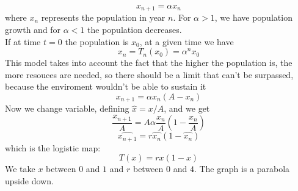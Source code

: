 $$
	x_{n+1} = \alpha x_n
$$
where $x_n$ represents the population in year $n$. For $\alpha > 1$, we have population growth and for $\alpha < 1$ the population decreases. \\
If at time $t=0$ the population is $x_0$, at a given time we have
$$
	x_n = T_n(x_0) = \alpha^n x_0
$$
This model takes into account the fact that the higher the population is, the more resouces are needed, so there should be a limit that can't be surpassed, because the enviroment wouldn't be able to sustain it
$$
	x_{n+1} = \alpha x_n(A-x_n)
$$
Now we change variable, defining $\hat{x} = x/A$, and we get
$$
	\frac{x_{n+1}}{A} = A\alpha \frac{x_n}{A}\left(1 - \frac{x_n}{A}\right)
$$
$$
	\hat{x_{n+1}} = r \hat{x_n}(1-\hat{x_n})
$$
which is the logistic map:
$$
	T(x) = rx(1-x)
$$
We take $x$ between $0$ and $1$ and $r$ between $0$ and $4$. The graph is a parabola upside down.
